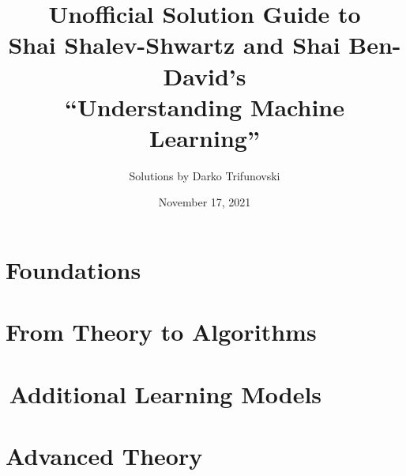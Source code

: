 \documentclass[oneside, 12pt]{memoir}
\title{Unofficial Solution Guide to \\
       Shai Shalev-Shwartz and Shai Ben-David's\\
       ``Understanding Machine Learning''}
\author{Solutions by Darko Trifunovski}
\date{November 17, 2021}
\theoremstyle{definition}
\begin{document}
\frontmatter
\begin{titlingpage}
  \maketitle
\end{titlingpage}
\tableofcontents

\mainmatter
\setcounter{chapter}{1}
\part{Foundations}








\part{From Theory to Algorithms}













\part{\,Additional Learning Models}






\part{Advanced Theory}
\setcounter{chapter}{28}

\setcounter{chapter}{30}

\end{document}
